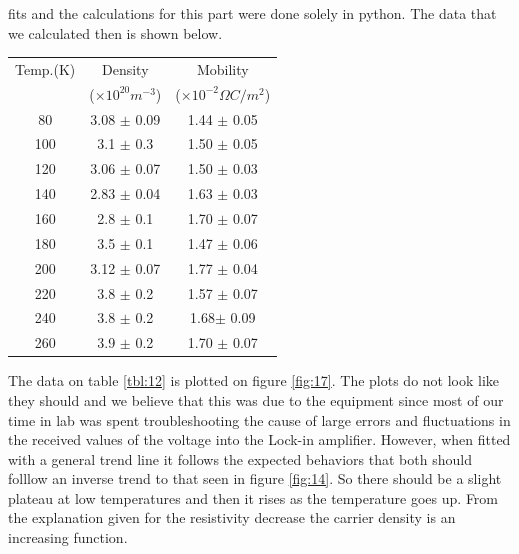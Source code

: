 \documentclass[twocolumn]{article}
\begin{document}
fits and the calculations for this part were done solely in python.
The data 
that we calculated then is shown below.
\begin{minipage}{\linewidth}
\Centering
\begin{tabular}{|c|c|c|}
\hline
Temp.(K) & Density & Mobility 
\\ & ($\times10^{20}m^{-3}$) & ($\times10^{-2}\Omega C / m^2$) \\ \hline
80 & 3.08 $\pm$ 0.09 & 1.44 $\pm$ 0.05 \\ \hline
100 & 3.1 $\pm$ 0.3 & 1.50 $\pm$ 0.05 \\ \hline
120 & 3.06 $\pm$ 0.07 & 1.50 $\pm$ 0.03 \\ \hline
140 & 2.83 $\pm$ 0.04 & 1.63 $\pm$ 0.03 \\ \hline
160 & 2.8 $\pm$ 0.1 & 1.70 $\pm$ 0.07 \\ \hline
180 & 3.5 $\pm$ 0.1 & 1.47 $\pm$ 0.06 \\ \hline
200 & 3.12 $\pm$ 0.07 & 1.77 $\pm$ 0.04 \\ \hline
220 & 3.8 $\pm$ 0.2 & 1.57 $\pm$ 0.07 \\ \hline
240 & 3.8 $\pm$ 0.2 & 1.68$\pm$ 0.09 \\ \hline
260 & 3.9 $\pm$ 0.2 & 1.70 $\pm$ 0.07 \\ \hline
\end{tabular}
\label{tbl:12}
\end{minipage}
The data on table \ref{tbl:12} is plotted on figure \ref{fig:17}. The plots do 
not look like they should and we believe that this was due to the equipment 
since most of our time in lab was spent troubleshooting the cause of large 
errors and fluctuations in the received values of the voltage into the 
Lock-in amplifier. However, when fitted with a general trend line it follows 
the expected behaviors that both should folllow an inverse trend to that seen 
in figure \ref{fig:14}. So there should be a slight plateau at low temperatures 
and then it rises as the temperature goes up. From the explanation given for 
the resistivity decrease the carrier density is an increasing function.
\end{document}
